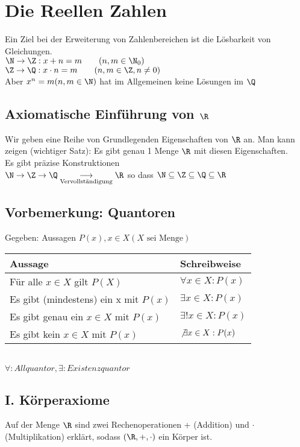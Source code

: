 \chapter{Die Reellen Zahlen}
Ein Ziel bei der Erweiterung von Zahlenbereichen ist die Lösbarkeit von Gleichungen.\\
$\N \to \Z: x + n = m \qquad (n,m \in \N_0)$\\
$\Z \to \Q: x \cdot n = m \qquad (n,m \in \Z, n \neq 0)$\\
Aber $x^n = m (n,m \in \N)$ hat im Allgemeinen keine Lösungen im $\Q$
\section*{Axiomatische Einführung von $\R$}
Wir geben eine Reihe von Grundlegenden Eigenschaften von $\R$ an.
Man kann zeigen (wichtiger Satz): Es gibt genau 1 Menge $\R$ mit diesen Eigenschaften.\\
Es gibt präzise Konstruktionen\\
$\N \to \Z \to \Q \underset{\text{Vervollständigung}}{\longrightarrow} \R$ so dass $\N \subseteq \Z \subseteq \Q \subseteq \R$
\section{Vorbemerkung: Quantoren}
Gegeben: Aussagen $P(x), x\in X (X \text{ sei Menge})$\\
\begin{tabular}{l|l}
Aussage & Schreibweise\\\hline
Für alle $x\in X$ gilt $P(X)$ & $\forall x\in X: P(x)$\\
Es gibt (mindestens) ein x mit $P(x)$ & $\exists x \in X: P(x)$\\
Es gibt genau ein $x \in X$ mit $P(x)$ & $\exists! x \in X: P(x)$\\
Es gibt kein $x \in X$ mit $P(x)$ & $\not\exists x\in X: P(x)$
\end{tabular}\\
$\forall: Allquantor, \exists: Existenzquantor$
\section*{I. Körperaxiome}
Auf der Menge $\R$ sind zwei Rechenoperationen + (Addition) und $\cdot$ (Multiplikation) erklärt, sodass $(\R, +, \cdot)$ ein Körper ist.
